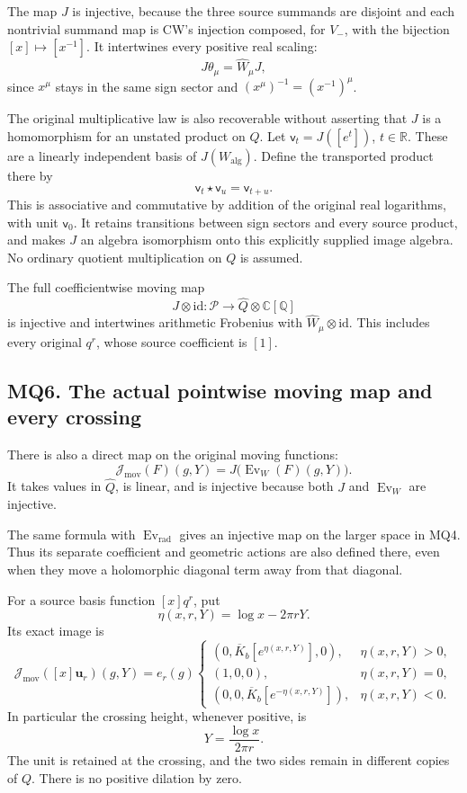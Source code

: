 The map \(J\) is injective, because the three source summands are
disjoint and each nontrivial summand map is CW's injection composed, for
\(V_-\), with the bijection \([x]\mapsto[x^{-1}]\). It intertwines every
positive real scaling: \[
J\theta_\mu=\widehat W_\mu J,
\tag{MQ5.2}
\] since \(x^\mu\) stays in the same sign sector and
\((x^\mu)^{-1}=(x^{-1})^\mu\).

The original multiplicative law is also recoverable without asserting
that \(J\) is a homomorphism for an unstated product on \(Q\). Let
\(\mathsf v_t=J([e^t])\), \(t\in\mathbb R\). These are a linearly
independent basis of \(J(W_{\mathrm{alg}})\). Define the transported
product there by \[
\mathsf v_t\star\mathsf v_u=\mathsf v_{t+u}.
\tag{MQ5.3}
\] This is associative and commutative by addition of the original real
logarithms, with unit \(\mathsf v_0\). It retains transitions between
sign sectors and every source product, and makes \(J\) an algebra
isomorphism onto this explicitly supplied image algebra. No ordinary
quotient multiplication on \(Q\) is assumed.

The full coefficientwise moving map \[
J\otimes\mathrm{id}:\mathcal P\longrightarrow
\widehat Q\otimes\mathbb C[\mathbb Q]
\tag{MQ5.4}
\] is injective and intertwines arithmetic Frobenius with
\(\widehat W_\mu\otimes\mathrm{id}\). This includes every original
\(q^r\), whose source coefficient is \([1]\).

\subsection{MQ6. The actual pointwise moving map and every
crossing}\label{mq6.-the-actual-pointwise-moving-map-and-every-crossing}

There is also a direct map on the original moving functions: \[
\boxed{
\mathcal J_{\mathrm{mov}}(F)(g,Y)
=J\bigl(\operatorname{Ev}_W(F)(g,Y)\bigr).}
\tag{MQ6.1}
\] It takes values in \(\widehat Q\), is linear, and is injective
because both \(J\) and \(\operatorname{Ev}_W\) are injective.

The same formula with \(\operatorname{Ev}_{\mathrm{rad}}\) gives an
injective map on the larger space in MQ4. Thus its separate coefficient
and geometric actions are also defined there, even when they move a
holomorphic diagonal term away from that diagonal.

For a source basis function \([x]q^r\), put \[
\eta(x,r,Y)=\log x-2\pi rY.
\] Its exact image is \[
\mathcal J_{\mathrm{mov}}([x]\mathbf u_r)(g,Y)
=e_r(g)
\begin{cases}
(0,\overline K_b[e^{\eta(x,r,Y)}],0),&\eta(x,r,Y)>0,\\
(1,0,0),&\eta(x,r,Y)=0,\\
(0,0,\overline K_b[e^{-\eta(x,r,Y)}]),&\eta(x,r,Y)<0.
\end{cases}
\tag{MQ6.2}
\] In particular the crossing height, whenever positive, is \[
Y=\frac{\log x}{2\pi r}.
\] The unit is retained at the crossing, and the two sides remain in
different copies of \(Q\). There is no positive dilation by zero.

